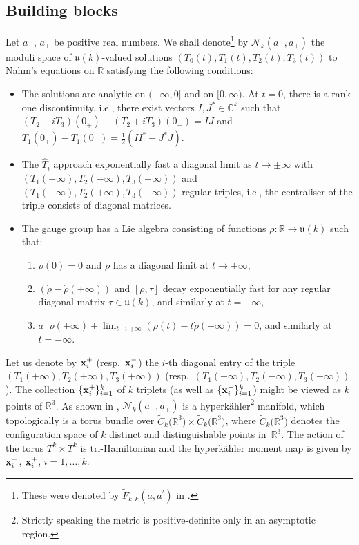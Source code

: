 \documentclass[pdftex]{sigma}
\renewcommand{\u}{{\mathfrak u}}
\numberwithin{equation}{section}
\newcommand{\oC}{{\mathbb{C}}}
\newcommand{\oR}{{\mathbb{R}}}
\newcommand{\sN}{{\mathcal{N}}}
\begin{document}
{\subsection{Building blocks}
Let $a_-$, $a_+$ be positive real numbers. We shall denote\footnote{These were denoted by $\tilde F_{k,k}(a,a^\prime)$ in \cite{BSU}.} by $\sN_k(a_-,a_+)$ the moduli space of $\u(k)$-valued solutions {$(T_0(t),T_1(t),T_2(t),T_3(t))$} to Nahm's equations on $\oR$ satisfying the following conditions:
 \begin{itemize}\itemsep=0pt
 \item The solutions are analytic on $(-\infty, 0]$ and on $[0,\infty)$. At $t=0$, there is a rank one discontinuity, i.e., there exist vectors $I,J^\ast \in\oC^k$ such that $(T_2+i T_3)(0_+)-(T_2+i T_3)(0_-)=IJ$
and $T_1(0_+)-T_1(0_-)=\frac{1}{2}(II^\ast-J^\ast J).$
 	\item The $\hat{T}_i$ approach exponentially fast a diagonal limit as $t\rightarrow \pm\infty$ with $(T_1(-\infty),T_2(-\infty),\allowbreak T_3(-\infty))$ and $(T_1(+\infty),T_2(+\infty), T_3(+\infty))$ regular triples, i.e., the centraliser of the triple consists of diagonal matrices.
 	\item The gauge group has a Lie algebra consisting of functions $\rho\colon \oR\rightarrow\mathfrak{u}(k)$ such that:
 	\begin{enumerate}\itemsep=0pt
 		\item[(1)] $\rho(0)=0$ and $\dot{\rho}$ has a diagonal limit at $t\rightarrow \pm\infty$,
 		\item[(2)] $(\dot{\rho}-\dot{\rho}(+\infty))$ and $[\rho,\tau]$ decay exponentially fast for any regular diagonal matrix $\tau\in\mathfrak{u}(k)$, and similarly at $t=-\infty$,
 		\item[(3)] $a_+\dot{\rho}(+\infty)+\lim_{t\rightarrow +\infty}(\rho(t)-t\dot{\rho}(+\infty))=0$,
 		and similarly at $t=-\infty$.
 	\end{enumerate}
 \end{itemize}
 Let us denote by ${\bf x}^+_i$ (resp.~${\bf x}^-_i$) the $i$-th diagonal entry of the triple {$(T_1(+\infty),\allowbreak T_2(+\infty),\allowbreak T_3(+\infty))$} (resp.~$(T_1(-\infty),T_2(-\infty),T_3(-\infty))$).
The collection $\{{\bf x}_i^+\}_{i=1}^k$ of $k$ triplets (as well as $\{{\bf x}_i^-\}_{i=1}^k$)
might be viewed as $k$ points of $\oR^3$.
 As shown in \cite{BSU}, $\sN_k(a_-,a_+)$ is a hyperk\"ahler\footnote{Strictly speaking the metric is positive-definite only in an asymptotic region.} manifold, which topologically is a torus bundle over $\tilde C_k\big(\oR^3\big)\times \tilde C_k\big(\oR^3\big) $, where $\tilde C_k\big(\oR^3\big)$ denotes the configuration space of $k$ distinct and distinguishable points in~$\oR^3$. The action of the torus $T^k\times T^k$ is tri-Hamiltonian and the hyperk\"ahler moment map is given by ${\bf x}^-_i$, ${\bf x}^+_i$, $i=1,\dots,k$.
}
\end{document}
